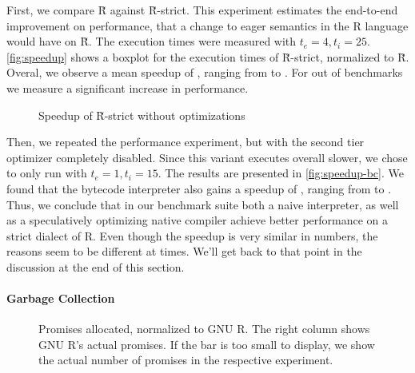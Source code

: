 \documentclass[review,nonacm,screen,acmsmall,anonymous=true]{acmart}
\renewcommand{\Rsh}{{\sf\u R}\xspace}
\newcommand{\Rshstrict}{{\sf\u R-strict}\xspace}
\begin{document}
First, we compare \Rsh against \Rshstrict. This experiment estimates the end-to-end
improvement on performance, that a change to eager semantics in the R language
would have on \Rsh. The execution times were measured with $t_e = 4, t_i = 25$.
\autoref{fig:speedup} shows a boxplot for the execution times of \Rsh-strict,
normalized to \Rsh. Overal, we observe a mean speedup of
\speedupRshStrict, ranging from \speedupRshStrictMin to \speedupRshStrictMax.
For \speedupRshStrictSignificant out of \benchmarkSuiteSize benchmarks we measure a significant increase in performance.
%
\begin{figure}[h]
  \centering
  
  \caption{Speedup of \Rshstrict without optimizations}
  \label{fig:speedup-bc}
\end{figure}
%
Then, we repeated the performance experiment, but with the second tier
optimizer completely disabled. Since this variant executes overall \rshBCSlowdown
slower, we chose to only run with $t_e = 1, t_i = 15$.
The results are presented in \autoref{fig:speedup-bc}. We found that the bytecode
interpreter also gains a speedup of \speedupBCRshStrict, ranging from
\speedupBCRshStrictMin to \speedupBCRshStrictMax.
%
Thus, we conclude that in our benchmark suite both a naive interpreter, as well as a speculatively
optimizing native compiler achieve better performance on a strict dialect of R.
Even though the speedup is very similar in numbers, the reasons seem to be
different at times. We'll get back to that point in the discussion at the end of
this section.

\paragraph{Garbage Collection}

\begin{figure}[h]
  \centering
  
  \caption{Promises allocated, normalized to GNU R. The right column shows GNU R's actual promises. If the bar is too small to display, we show the actual number of promises in the respective experiment.}
  \label{fig:gc-pressure}
\end{figure}
\end{document}
